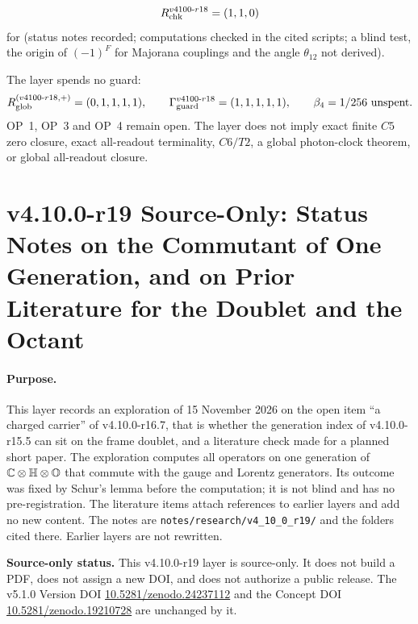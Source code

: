 \[
R_{\rm chk}^{v4100\text{-}r18}=(1,1,0)
\]
for (status notes recorded; computations checked in the cited scripts; a blind test, the origin of \((-1)^F\) for Majorana couplings and
the angle \(\theta_{12}\) not derived).

The layer spends no guard:
\[
R_{\rm glob}^{(v4100\text{-}r18,+)}=(0,1,1,1,1),
\qquad
\Gamma_{\rm guard}^{v4100\text{-}r18}=(1,1,1,1,1),
\qquad
\beta_4=1/256\ \text{unspent}.
\]
OP~1, OP~3 and OP~4 remain open.  The layer does not imply exact finite \(C5\) zero closure, exact all-readout terminality,
\(C6/T2\), a global photon-clock theorem, or global all-readout closure.

\clearpage
\section*{v4.10.0-r19 Source-Only: Status Notes on the Commutant of One Generation, and on Prior Literature for the Doublet and the Octant}
\label{sec:v4100-r19-commutant-literature}

\paragraph{Purpose.}
This layer records an exploration of 15 November 2026 on the open item ``a charged carrier'' of v4.10.0-r16.7, that is whether
the generation index of v4.10.0-r15.5 can sit on the frame doublet, and a literature check made for a planned short paper.
The exploration computes all operators on one generation of \(\mathbb C\otimes\mathbb{H}\otimes\mathbb{O}\) that commute with the gauge and
Lorentz generators.  Its outcome was fixed by Schur's lemma before the computation; it is not blind and has no
pre-registration.  The literature items attach references to earlier layers and add no new content.  The notes are
\texttt{notes/\allowbreak research/\allowbreak v4\_10\_0\_r19/} and the folders cited there.  Earlier layers are not rewritten.

\noindent\textbf{Source-only status.}
This v4.10.0-r19 layer is source-only.  It does not build a PDF, does not assign a new DOI,
and does not authorize a public release.  The v5.1.0 Version DOI
\href{https://doi.org/10.5281/zenodo.24237112}{10.5281/zenodo.24237112} and the Concept DOI
\href{https://doi.org/10.5281/zenodo.19210728}{10.5281/zenodo.19210728} are unchanged by it.

